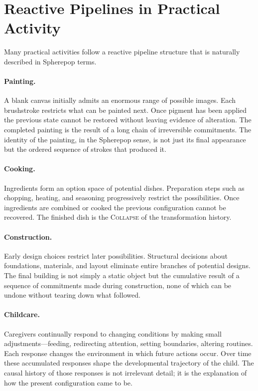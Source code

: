 \documentclass[12pt]{article}
\begin{document}
\section{Reactive Pipelines in Practical Activity}
\label{sec:pipelines}

Many practical activities follow a reactive pipeline structure that is naturally described in Spherepop terms.

\paragraph{Painting.} A blank canvas initially admits an enormous range of possible images. Each brushstroke restricts what can be painted next. Once pigment has been applied the previous state cannot be restored without leaving evidence of alteration. The completed painting is the result of a long chain of irreversible commitments. The identity of the painting, in the Spherepop sense, is not just its final appearance but the ordered sequence of strokes that produced it.

\paragraph{Cooking.} Ingredients form an option space of potential dishes. Preparation steps such as chopping, heating, and seasoning progressively restrict the possibilities. Once ingredients are combined or cooked the previous configuration cannot be recovered. The finished dish is the \textsc{Collapse} of the transformation history.

\paragraph{Construction.} Early design choices restrict later possibilities. Structural decisions about foundations, materials, and layout eliminate entire branches of potential designs. The final building is not simply a static object but the cumulative result of a sequence of commitments made during construction, none of which can be undone without tearing down what followed.

\paragraph{Childcare.} Caregivers continually respond to changing conditions by making small adjustments---feeding, redirecting attention, setting boundaries, altering routines. Each response changes the environment in which future actions occur. Over time these accumulated responses shape the developmental trajectory of the child. The causal history of those responses is not irrelevant detail; it is the explanation of how the present configuration came to be.
\end{document}
